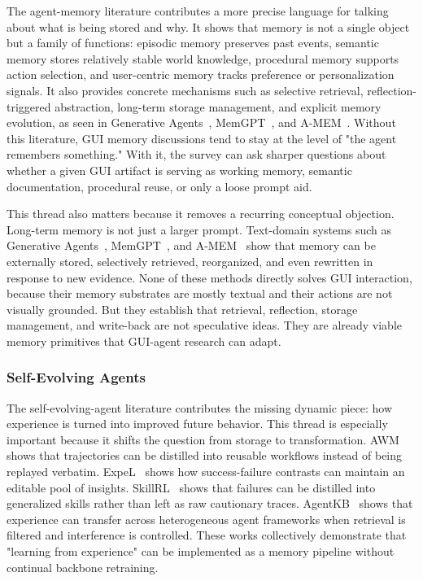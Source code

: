 \documentclass{article}
\begin{document}
The agent-memory literature contributes a more precise language for
talking about what is being stored and why. It shows that memory is not
a single object but a family of functions: episodic memory preserves
past events, semantic memory stores relatively stable world knowledge,
procedural memory supports action selection, and user-centric memory
tracks preference or personalization signals. It also provides concrete
mechanisms such as selective retrieval, reflection-triggered
abstraction, long-term storage management, and explicit memory
evolution, as seen in Generative
Agents~\parencite{park2023generativeagentsinteractivesimulacra},
MemGPT~\parencite{packer2024memgptllmsoperatingsystems}, and
A-MEM~\parencite{xu2025amemagenticmemoryllm}. Without this
literature, GUI memory discussions tend to stay at the level of "the
agent remembers something." With it, the survey can ask sharper
questions about whether a given GUI artifact is serving as working
memory, semantic documentation, procedural reuse, or only a loose prompt
aid.

This thread also matters because it removes a recurring conceptual
objection. Long-term memory is not just a larger prompt. Text-domain
systems such as Generative
Agents~\parencite{park2023generativeagentsinteractivesimulacra},
MemGPT~\parencite{packer2024memgptllmsoperatingsystems}, and
A-MEM~\parencite{xu2025amemagenticmemoryllm} show that memory can be externally stored,
selectively retrieved, reorganized, and even rewritten in response to
new evidence. None of these methods directly solves GUI interaction,
because their memory substrates are mostly textual and their actions
are not visually grounded. But they establish that retrieval,
reflection, storage management, and write-back are not speculative
ideas. They are already viable memory primitives that GUI-agent
research can adapt.

\subsubsection{Self-Evolving Agents}\label{313-self-evolving-agents}

The self-evolving-agent literature contributes the missing dynamic
piece: how experience is turned into improved future behavior. This
thread is especially important because it shifts the question from
storage to transformation. AWM~\parencite{wang2024agentworkflowmemory} shows that
trajectories can be distilled into reusable workflows instead of being
replayed verbatim. ExpeL~\parencite{zhao2024expelllmagentsexperiential} shows how
success-failure contrasts can maintain an editable pool of insights.
SkillRL~\parencite{xia2026skillrlevolvingagentsrecursive} shows that failures can be distilled
into generalized skills rather than left as raw cautionary traces.
AgentKB~\parencite{tang2025agentkbleveragingcrossdomain} shows that experience can transfer
across heterogeneous agent frameworks when retrieval is filtered and
interference is controlled. These works collectively demonstrate that
"learning from experience" can be implemented as a memory pipeline
without continual backbone retraining.
\end{document}
